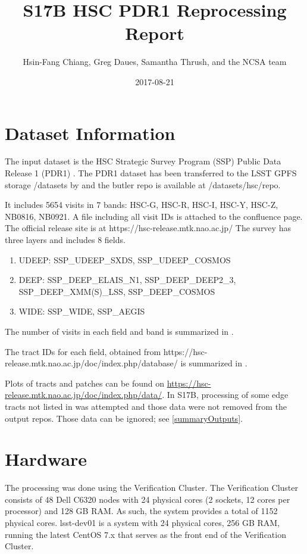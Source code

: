 \documentclass[DM,authoryear,toc]{lsstdoc}
\title{S17B HSC PDR1 Reprocessing Report}
\author{%
Hsin-Fang Chiang, Greg Daues, Samantha Thrush, and the NCSA team
}
\date{2017-08-21}
\begin{document}
\maketitle

\section{Dataset Information}
The input dataset is the HSC Strategic Survey Program (SSP) Public Data Release 1 (PDR1) \citep{2017arXiv170208449A}.
The PDR1 dataset has been transferred to the LSST GPFS storage /datasets by  and the butler repo is available at /datasets/hsc/repo.

It includes 5654 visits in 7 bands: HSC-G, HSC-R, HSC-I, HSC-Y, HSC-Z, NB0816, NB0921. A file including all visit IDs is attached to the confluence page.  The official release site is at https://hsc-release.mtk.nao.ac.jp/
The survey has three layers and includes 8 fields.
\begin{enumerate}
\item
UDEEP: SSP{\_}UDEEP{\_}SXDS, SSP{\_}UDEEP{\_}COSMOS
\item
DEEP: SSP{\_}DEEP{\_}ELAIS{\_}N1, SSP{\_}DEEP{\_}DEEP2{\_}3, SSP{\_}DEEP{\_}XMM(S){\_}LSS, SSP{\_}DEEP{\_}COSMOS
\item
WIDE: SSP{\_}WIDE, SSP{\_}AEGIS
\end{enumerate}

The number of visits in each field and band is summarized in .



The tract IDs for each field, obtained
from https://hsc-release.mtk.nao.ac.jp/doc/index.php/database/
is summarized in .



Plots of tracts and patches can be found on  \url{https://hsc-release.mtk.nao.ac.jp/doc/index.php/data/}. In S17B, processing of some edge tracts not listed in  was attempted and those data were not removed from the output repos. Those data can be ignored; see \ref{summaryOutputs}.

\section{Hardware}
The processing was done using the Verification Cluster.
The Verification Cluster consists of 48 Dell C6320 nodes with 24 physical cores (2 sockets, 12 cores per processor) and 128 GB RAM. As such, the system provides a total of 1152 physical cores.
lsst-dev01 is a system with 24 physical cores, 256 GB RAM, running the latest CentOS 7.x that serves as the front end of the Verification Cluster.
\end{document}
